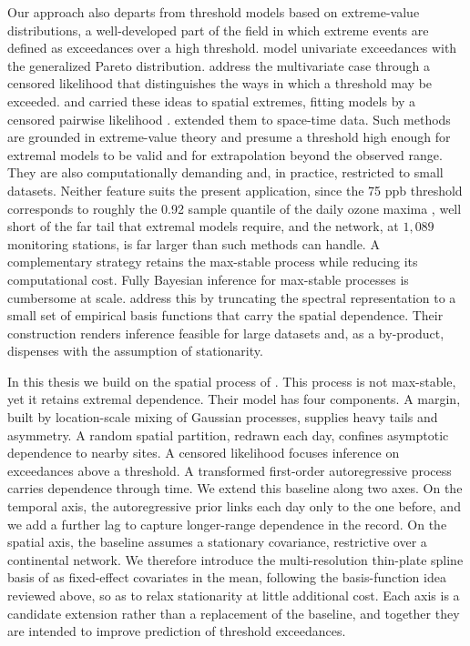 \documentclass[12pt]{article}
\begin{document}
Our approach also departs from threshold models based on extreme-value
distributions, a well-developed part of the field in which extreme events are
defined as exceedances over a high threshold. \textcite{Davison1990} model
univariate exceedances with the generalized Pareto distribution.
\textcite{Ledford1996} address the multivariate case through a censored
likelihood that distinguishes the ways in which a threshold may be exceeded.
\textcite{Wadsworth2012} and \textcite{Thibaud2013} carried these ideas to
spatial extremes, fitting models by a censored pairwise likelihood
\parencite{Padoan2010}. \textcite{Huser2014} extended them to space-time data.
Such methods are grounded in extreme-value theory and presume a threshold high
enough for extremal models to be valid and for extrapolation beyond the observed
range. They are also computationally demanding and, in practice, restricted to
small datasets. Neither feature suits the present application, since the 75 ppb threshold
corresponds to roughly the 0.92 sample quantile of the daily ozone maxima
\parencite{morris_space-time_2017}, well short of the far tail that extremal
models require, and the network, at $1{,}089$ monitoring stations, is far larger
than such methods can handle. A complementary strategy retains the max-stable process while
reducing its computational cost. Fully Bayesian inference for max-stable
processes is cumbersome at scale. \textcite{morris_exploration_2019} address this
by truncating the spectral representation to a small set of empirical basis
functions that carry the spatial dependence. Their construction renders inference
feasible for large datasets and, as a by-product, dispenses with the assumption
of stationarity.

In this thesis we build on the spatial \skewt process of
\textcite{morris_space-time_2017}. This process is not max-stable, yet it retains
extremal dependence. Their model has four components. A \skewt margin, built by
location-scale mixing of Gaussian processes, supplies heavy tails and asymmetry.
A random spatial partition, redrawn each day,
confines asymptotic dependence to nearby sites. A censored likelihood focuses
inference on exceedances above a threshold. A transformed first-order
autoregressive process carries dependence through time. We extend this baseline
along two axes. On the temporal axis, the autoregressive prior links each day
only to the one before, and we add a further lag to capture longer-range
dependence in the record. On the spatial axis, the baseline assumes a stationary
\Matern covariance, restrictive over a continental network.
We therefore introduce the multi-resolution thin-plate spline basis of
\textcite{tzeng_resolution_2018} as fixed-effect covariates in the mean,
following the basis-function idea reviewed above, so as to relax stationarity at
little additional cost. Each axis is a candidate extension rather than a
replacement of the baseline, and together they are intended to improve prediction
of threshold exceedances.
\end{document}
